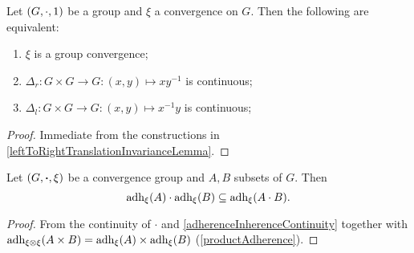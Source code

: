 \begin{lemma} \label{groupConvergenceIffDeltasContinuous}
Let $\sSet{G,\cdot, 1}$ be a group and $\xi$ a convergence on $G$. Then the following are equivalent:
\begin{enumerate}
\item $\xi$ is a group convergence;
\item $\Delta_r: G\times G \to G: (x,y) \mapsto xy^{-1}$ is continuous;
\item $\Delta_l: G\times G \to G: (x,y) \mapsto x^{-1}y$ is continuous;
\end{enumerate}
\end{lemma}
\begin{proof}
Immediate from the constructions in \ref{leftToRightTranslationInvarianceLemma}.
\end{proof}

\begin{lemma} \label{closureGroupOperation}
Let $\sSet{G, \boldsymbol{\cdot}, \xi}$ be a convergence group and $A,B$ subsets of $G$. Then
\[ \operatorname{adh}_\xi(A)\cdot \operatorname{adh}_\xi(B) \subseteq \operatorname{adh}_\xi(A\cdot B). \]
\end{lemma}
\begin{proof}
From the continuity of $\cdot$ and \ref{adherenceInherenceContinuity} together with $\operatorname{adh}_{\xi\otimes\xi}(A\times B) = \operatorname{adh}_\xi(A)\times \operatorname{adh}_\xi(B)$ (\ref{productAdherence}).
\end{proof}

